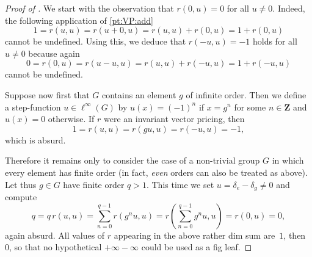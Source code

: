 \documentclass[11pt]{amsart}
\numberwithin{equation}{section}
\theoremstyle{definition}
\theoremstyle{definition}
\newcommand*{\ZZ}{\mathbf{Z}}
\begin{document}
\begin{proof}[Proof of ]
We start with the observation that $r(0,u)=0$ for all $u\neq 0$. Indeed, the following application of \ref{pt:VP:add}
\begin{equation*}
1 = r(u,u) = r(u+0, u) = r(u, u) + r(0,u) = 1 + r(0,u) 
\end{equation*}
cannot be undefined. Using this, we deduce that $r(-u, u) = - 1$ holds for all $u\neq 0$ because again
\begin{equation*}
0 = r(0,u) = r(u-u, u) = r(u, u) + r(-u,u) = 1 + r(-u,u) 
\end{equation*}
cannot be undefined.

Suppose now first that $G$ contains an element $g$ of infinite order. Then we define a step-function $u\in \ell^\infty(G)$ by $u(x)=(-1)^n$ if $x=g^n$ for some $n\in\ZZ$ and $u(x)=0$ otherwise. If $r$ were an invariant vector pricing, then
\begin{equation*}
1 = r(u, u) = r (g u, u) = r(-u, u) = -1,
\end{equation*}
which is absurd.

Therefore it remains only to consider the case of a non-trivial group $G$ in which every element has finite order (in fact, \emph{even} orders can also be treated as above). Let thus $g\in G$ have finite order $q>1$. This time we set $u=\delta_e - \delta_g \neq 0$ and compute
\begin{equation*}
q = q\, r(u,u) = \sum_{n=0}^{q-1} r(g^n u,u) = r\left(\sum_{n=0}^{q-1} g^n u, u\right) = r(0, u) = 0,
\end{equation*}
again absurd. All values of $r$ appearing in the above rather dim sum are~$1$, then~$0$, so that no hypothetical $+\infty - \infty$ could be used as a fig leaf.
\end{proof}



%


\end{document}
